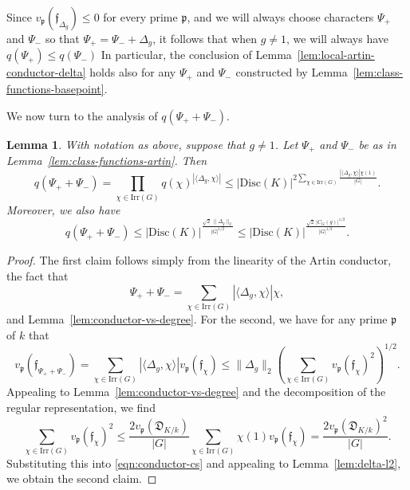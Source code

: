 \documentclass[12pt]{amsart}
\newtheorem{lemma}[theorem]{Lemma}
\theoremstyle{definition} \newtheorem{definition}[theorem]{Definition}
\theoremstyle{example} \newtheorem{example}[theorem]{Example}
\theoremstyle{remark} \newtheorem{remark}{Remark}[theorem]
\numberwithin{equation}{section}
\numberwithin{theorem}{section}
\renewcommand{\leq}{\leqslant}
\begin{document}
	Since $v_\mathfrak{p}(\mathfrak{f}_{\Delta_g}) \leq 0$ for every prime $\mathfrak{p}$, and we will always choose characters $\Psi_+$ and $\Psi_-$ so that $\Psi_+ = \Psi_- + \Delta_g$, it follows that when $g \ne 1$, we will always have $q(\Psi_+) \leq q(\Psi_-)$  In particular, the conclusion of Lemma~\ref{lem:local-artin-conductor-delta} holds also for any $\Psi_+$ and $\Psi_-$ constructed by Lemma~\ref{lem:class-functions-basepoint}.
	
	We now turn to the analysis of $q(\Psi_+ + \Psi_-)$.
	
	\begin{lemma} \label{lem:sum-conductor}
		With notation as above, suppose that $g \ne 1$.  Let $\Psi_+$ and $\Psi_-$ be as in Lemma~\ref{lem:class-functions-artin}.  Then
			\[
				q(\Psi_+ + \Psi_-) 
					= \prod_{\chi \in \mathrm{Irr}(G)} q(\chi)^{ |\langle \Delta_g, \chi\rangle|} 
					\leq |\mathrm{Disc}(K)|^{2 \sum_{\chi \in \mathrm{Irr}(G)} \frac{|\langle \Delta_g, \chi\rangle| \chi(1)}{|G|}}.
			\]
		Moreover, we also have
			\[
				q(\Psi_+ + \Psi_-)
					\leq |\mathrm{Disc}(K)|^{ \frac{ \sqrt{2} \, \|\Delta_g\|_2}{|G|^{1/2}}}
					\leq |\mathrm{Disc}(K)|^{ \frac{ \sqrt{2} \, |C_G(g)|^{1/2} }{|G|^{1/2}}}.
			\]
	\end{lemma}
	\begin{proof}
		The first claim follows simply from the linearity of the Artin conductor, the fact that
			\[
				\Psi_+ + \Psi_-
					= \sum_{\chi \in \mathrm{Irr}(G)} |\langle \Delta_g, \chi\rangle| \chi,
			\]
		and Lemma~\ref{lem:conductor-vs-degree}.  For the second, we have for any prime $\mathfrak{p}$ of $k$ that
			\begin{equation}\label{eqn:conductor-cs}
				v_\mathfrak{p}(\mathfrak{f}_{\Psi_+ + \Psi_-})
					= \sum_{\chi \in \mathrm{Irr}(G)} |\langle \Delta_g, \chi\rangle| v_\mathfrak{p}(\mathfrak{f}_\chi)
					\leq \|\Delta_g\|_2 \left( \sum_{\chi \in \mathrm{Irr}(G)} v_\mathfrak{p}(\mathfrak{f}_\chi)^2\right)^{1/2}.
			\end{equation}
		Appealing to Lemma~\ref{lem:conductor-vs-degree} and the decomposition of the regular representation, we find
			\[
				\sum_{\chi \in \mathrm{Irr}(G)} v_\mathfrak{p}(\mathfrak{f}_\chi)^2
					\leq \frac{2 v_\mathfrak{p}(\mathfrak{D}_{K/k}) }{|G|} \sum_{\chi \in \mathrm{Irr}(G)} \chi(1) v_\mathfrak{p}(\mathfrak{f}_\chi) = \frac{2 v_\mathfrak{p}(\mathfrak{D}_{K/k})^2}{|G|}.
			\]
		Substituting this into \eqref{eqn:conductor-cs} and appealing to Lemma~\ref{lem:delta-l2}, we obtain the second claim.
	\end{proof}
	
\end{document}
